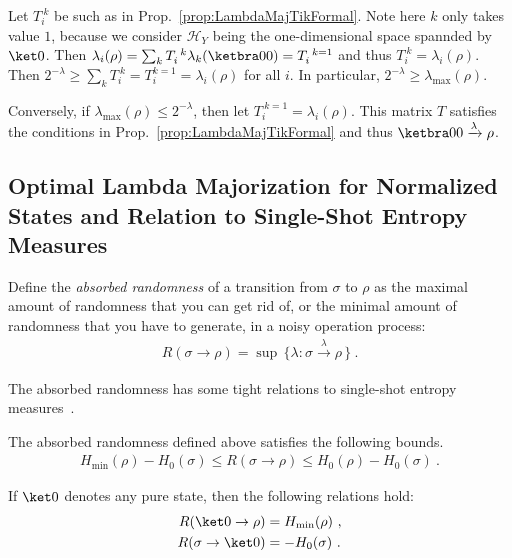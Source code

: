 \documentclass[11pt,a4paper]{article}
\def\Hs{\mathscr{H}}%
\def\HH{{H}}%
\def\Hmin{\HH_\mathrm{min}}
\def\Hzero{\HH_0}
\newenvironment{myproof}[1][\proofname]{%
  \color{prooftextcolor} \footnotesize \proof[\itshape #1]\hspace*{1.2mm}%
}{\endproof}
\newcommand{\lambdamaj}[1]{\xrightarrow{#1}}
\begin{document}
\begin{myproof}[Proof of Prop.~\ref{prop:LambdaMajorizedDOpsByPureState}]
  Let $T_i^{~k}$ be such as in Prop.~\ref{prop:LambdaMajTikFormal}. Note here $k$ only takes value
  $1$, because we consider $\Hs_Y$ being the one-dimensional space spannded by $\ket0$. Then
  $\lambda_i(\rho) = \sum_k T_i^{~k} \lambda_k(\ketbra00) = T_i^{~k=1}$ and thus
  $T_i^{~k}=\lambda_i(\rho)$. Then $2^{-\lambda} \geqslant \sum_k T_i^{~k} = T_i^{k=1} = \lambda_i(\rho)$ for
  all $i$. In particular, $2^{-\lambda}\geqslant \lambda_\mathrm{max}(\rho)$.

  Conversely, if $\lambda_\mathrm{max}(\rho) \leqslant 2^{-\lambda}$, then let $T_i^{~k=1}=\lambda_i(\rho)$. This
  matrix $T$ satisfies the conditions in Prop.~\ref{prop:LambdaMajTikFormal} and thus
  $\ketbra00\lambdamaj\lambda\rho$.
\end{myproof}


\subsection{Optimal Lambda Majorization for Normalized States and Relation to Single-Shot Entropy Measures}

Define the {\em absorbed randomness} of a transition from $\sigma$ to $\rho$ as the maximal amount of randomness
that you can get rid of, or the minimal amount of randomness that you have to generate, in a noisy operation
process:
\begin{align}
  \label{eq:AbsorbedRandomnessDef}
  R(\sigma\rightarrow\rho) = \sup\, \bigl\{ \lambda : \sigma \lambdamaj{\lambda} \rho \, \bigr\}\ .
\end{align}

The absorbed randomness has some tight relations to single-shot entropy measures~\cite{PhdRenner2005_SQKD}.

\begin{prop}
  \label{prop:RBoundsHminmax}
  The absorbed randomness defined above satisfies the following bounds.
  \begin{align*}
    \Hmin(\rho)-\Hzero(\sigma) \leqslant R(\sigma\rightarrow\rho) \leqslant \Hzero(\rho) - \Hzero(\sigma) \ .
  \end{align*}
\end{prop}

\begin{prop}
  \label{prop:RpurerhoAndRsigmapure}
  If $\ket0$ denotes any pure state, then the following relations hold:
  \begin{align}
    \label{eq:Rpurerho}  R(\ket 0 \rightarrow \rho) &= \Hmin(\rho)\ ,\\
    \label{eq:Rsigmapure}  R(\sigma \rightarrow \ket 0) &= -\Hzero(\sigma)\ .
  \end{align}
\end{prop}
\end{document}
